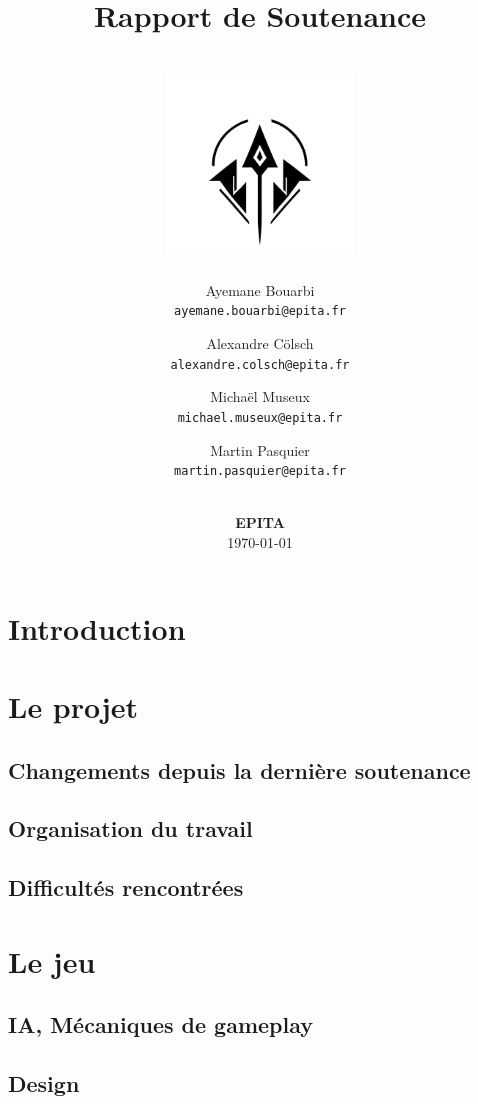 \documentclass[12pt]{article}
\title{
    Rapport de Soutenance \\
    \textbf{\gameName} \\
    \vspace{0.5cm}
    \includegraphics[width=5cm]{0.format/logo.png}
    \vspace{4.2cm}
}
\author{
    Ayemane Bouarbi \\
    \texttt{ayemane.bouarbi@epita.fr}
    \vspace{0.5cm}\and
    Alexandre Cölsch \\
    \texttt{alexandre.colsch@epita.fr}
    \vspace{0.5cm}\and
    Michaël Museux \\
    \texttt{michael.museux@epita.fr}
    \vspace{0.5cm}\and
    Martin Pasquier \\
    \texttt{martin.pasquier@epita.fr}
}
\date{
    \vspace{1.5cm}
    \textbf{\companyName} \\
    \vspace{0.3cm}
    \textbf{EPITA} \\
    \vspace{1.5cm}
    \today
}
\begin{document}
\begin{titlepage}
    \maketitle
    \thispagestyle{empty} %
\end{titlepage}

\newpage
\thispagestyle{empty}
\mbox{}

\newpage
\tableofcontents

\newpage
\section{Introduction}



\newpage
\section{Le projet}

\subsection{Changements depuis la dernière soutenance}


\subsection{Organisation du travail}


\subsection{Difficultés rencontrées}



\newpage
\section{Le jeu}

\subsection{IA, Mécaniques de gameplay}


\subsection{Design}

\end{document}
